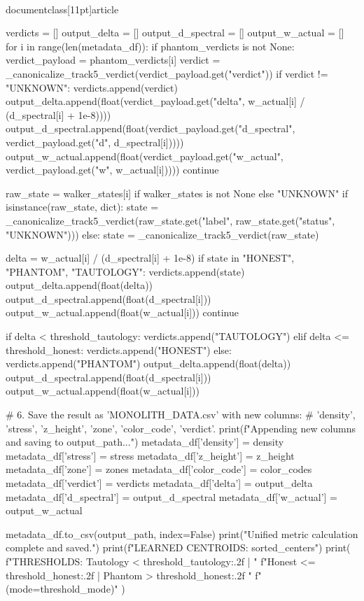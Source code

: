 \\documentclass[11pt]{article}
\begin{document}
\begin{CodeBlock}
    verdicts = []
    output_delta = []
    output_d_spectral = []
    output_w_actual = []
    for i in range(len(metadata_df)):
        if phantom_verdicts is not None:
            verdict_payload = phantom_verdicts[i]
            verdict = _canonicalize_track5_verdict(verdict_payload.get("verdict"))
            if verdict != "UNKNOWN":
                verdicts.append(verdict)
                output_delta.append(float(verdict_payload.get("delta", w_actual[i] / (d_spectral[i] + 1e-8))))
                output_d_spectral.append(float(verdict_payload.get("d_spectral", verdict_payload.get("d", d_spectral[i]))))
                output_w_actual.append(float(verdict_payload.get("w_actual", verdict_payload.get("w", w_actual[i]))))
                continue

        raw_state = walker_states[i] if walker_states is not None else "UNKNOWN"
        if isinstance(raw_state, dict):
            state = _canonicalize_track5_verdict(raw_state.get("label", raw_state.get("status", "UNKNOWN")))
        else:
            state = _canonicalize_track5_verdict(raw_state)

        delta = w_actual[i] / (d_spectral[i] + 1e-8)
        if state in {"HONEST", "PHANTOM", "TAUTOLOGY"}:
            verdicts.append(state)
            output_delta.append(float(delta))
            output_d_spectral.append(float(d_spectral[i]))
            output_w_actual.append(float(w_actual[i]))
            continue

        if delta < threshold_tautology:
            verdicts.append("TAUTOLOGY")
        elif delta <= threshold_honest:
            verdicts.append("HONEST")
        else:
            verdicts.append("PHANTOM")
        output_delta.append(float(delta))
        output_d_spectral.append(float(d_spectral[i]))
        output_w_actual.append(float(w_actual[i]))

    # 6. Save the result as 'MONOLITH_DATA.csv' with new columns:
    #    'density', 'stress', 'z_height', 'zone', 'color_code', 'verdict'.
    print(f"Appending new columns and saving to {output_path}...")
    metadata_df['density'] = density
    metadata_df['stress'] = stress
    metadata_df['z_height'] = z_height
    metadata_df['zone'] = zones
    metadata_df['color_code'] = color_codes
    metadata_df['verdict'] = verdicts
    metadata_df['delta'] = output_delta
    metadata_df['d_spectral'] = output_d_spectral
    metadata_df['w_actual'] = output_w_actual

    metadata_df.to_csv(output_path, index=False)
    print("Unified metric calculation complete and saved.")
    print(f"LEARNED CENTROIDS: {sorted_centers}")
    print(
        f"THRESHOLDS: Tautology < {threshold_tautology:.2f} | "
        f"Honest <= {threshold_honest:.2f} | Phantom > {threshold_honest:.2f} "
        f"(mode={threshold_mode})"
    )


\end{CodeBlock}
\end{document}

